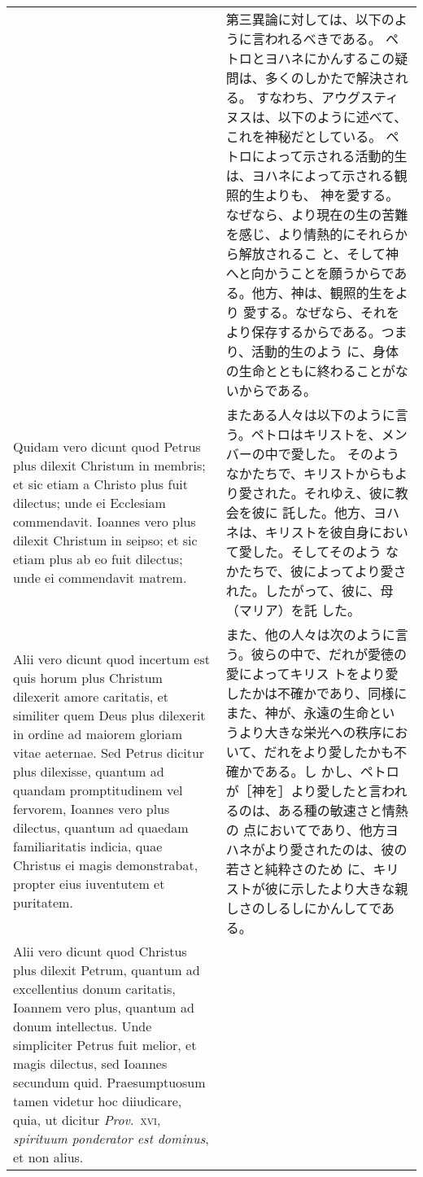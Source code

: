 \documentclass[10pt]{jsarticle} %
\begin{document}
\begin{longtable}{p{21em}p{21em}}
&

第三異論に対しては、以下のように言われるべきである。
ペトロとヨハネにかんするこの疑問は、多くのしかたで解決される。
すなわち、アウグスティヌスは、以下のように述べて、これを神秘だとしている。
ペトロによって示される活動的生は、ヨハネによって示される観照的生よりも、
 神を愛する。なぜなら、より現在の生の苦難を感じ、より情熱的にそれらから解放されるこ
 と、そして神へと向かうことを願うからである。他方、神は、観照的生をより
 愛する。なぜなら、それをより保存するからである。つまり、活動的生のよう
 に、身体の生命とともに終わることがないからである。

\\

Quidam vero dicunt quod Petrus plus dilexit Christum
 in membris; et sic etiam a Christo plus fuit dilectus; unde ei
 Ecclesiam commendavit. Ioannes vero plus dilexit Christum in seipso; et
 sic etiam plus ab eo fuit dilectus; unde ei commendavit matrem. 


&

またある人々は以下のように言う。ペトロはキリストを、メンバーの中で愛した。
そのようなかたちで、キリストからもより愛された。それゆえ、彼に教会を彼に
 託した。他方、ヨハネは、キリストを彼自身において愛した。そしてそのよう
 なかたちで、彼によってより愛された。したがって、彼に、母（マリア）を託
 した。


\\

Alii
 vero dicunt quod incertum est quis horum plus Christum dilexerit amore
 caritatis, et similiter quem Deus plus dilexerit in ordine ad maiorem
 gloriam vitae aeternae. Sed Petrus dicitur plus dilexisse, quantum ad
 quandam promptitudinem vel fervorem, Ioannes vero plus dilectus,
 quantum ad quaedam familiaritatis indicia, quae Christus ei magis
 demonstrabat, propter eius iuventutem et puritatem. 


&

また、他の人々は次のように言う。彼らの中で、だれが愛徳の愛によってキリス
 トをより愛したかは不確かであり、同様にまた、神が、永遠の生命とい
 うより大きな栄光への秩序において、だれをより愛したかも不確かである。し
 かし、ペトロが［神を］より愛したと言われるのは、ある種の敏速さと情熱の
 点においてであり、他方ヨハネがより愛されたのは、彼の若さと純粋さのため
 に、キリストが彼に示したより大きな親しさのしるしにかんしてである。


\\

Alii vero dicunt
 quod Christus plus dilexit Petrum, quantum ad excellentius donum
 caritatis, Ioannem vero plus, quantum ad donum intellectus. Unde
 simpliciter Petrus fuit melior, et magis dilectus, sed Ioannes secundum
 quid. Praesumptuosum tamen videtur hoc diiudicare, quia, ut dicitur
 {\itshape Prov}.~{\scshape xvi}, {\itshape spirituum ponderator est dominus}, et non alius.



\end{longtable}
\end{document}
